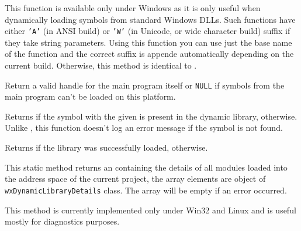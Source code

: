 
This function is available only under Windows as it is only useful when
dynamically loading symbols from standard Windows DLLs. Such functions have
either \texttt{'A'} (in ANSI build) or \texttt{'W'} (in Unicode, or wide
character build) suffix if they take string parameters. Using this function you
can use just the base name of the function and the correct suffix is appende
automatically depending on the current build. Otherwise, this method is
identical to .


\label{wxdynamiclibrarygetprogramhandle}


Return a valid handle for the main program itself or \texttt{NULL} if symbols
from the main program can't be loaded on this platform.


\label{wxdynamiclibraryhassymbol}


Returns \true if the symbol with the given  is present in the dynamic
library, \false otherwise. Unlike ,
this function doesn't log an error message if the symbol is not found.



\label{wxdynamiclibraryisloaded}


Returns \true if the library was successfully loaded, \false otherwise.


\label{wxdynamiclibrarylistloaded}


This static method returns an  containing the details
of all modules loaded into the address space of the current project, the array
elements are object of \texttt{wxDynamicLibraryDetails} class. The array will
be empty if an error occurred.

This method is currently implemented only under Win32 and Linux and is useful
mostly for diagnostics purposes.


